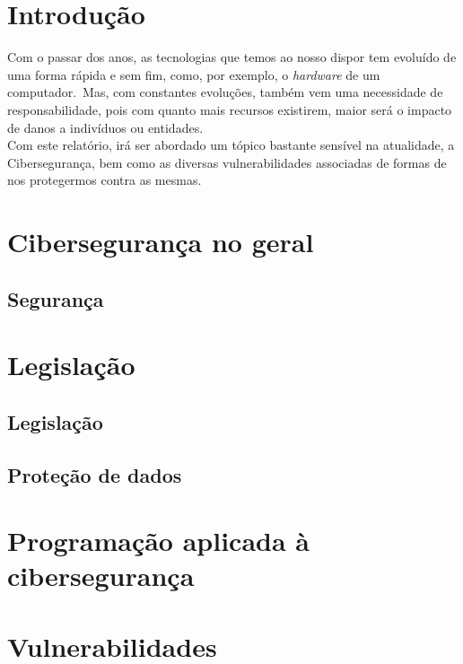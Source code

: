 \documentclass{report}
\begin{document}
\tableofcontents
\listoftables     %
\listoffigures    %


\clearpage
{}

\chapter*{Introdução}
\label{ch:introducao}

Com o passar dos anos, as tecnologias que temos ao nosso dispor tem evoluído de uma forma rápida e sem fim, como, por exemplo, o \textit{hardware} de um computador.\ Mas, com constantes evoluções, também vem uma necessidade de responsabilidade, pois com quanto mais recursos existirem, maior será o impacto de danos a indivíduos ou entidades.\\

Com este relatório, irá ser abordado um tópico bastante sensível na atualidade, a Cibersegurança, bem como as diversas vulnerabilidades associadas de formas de nos protegermos contra as mesmas.

\chapter{Cibersegurança no geral}
\label{ch:ciberseguranca-no-geral}
\section{Segurança}

\chapter{Legislação}
\label{ch:legislacao}
\section{Legislação}
\section{Proteção de dados}

\chapter{Programação aplicada à cibersegurança}
\label{ch:programacao}

\chapter{Vulnerabilidades}
\label{chap.vulnerabilidade}
\end{document}

